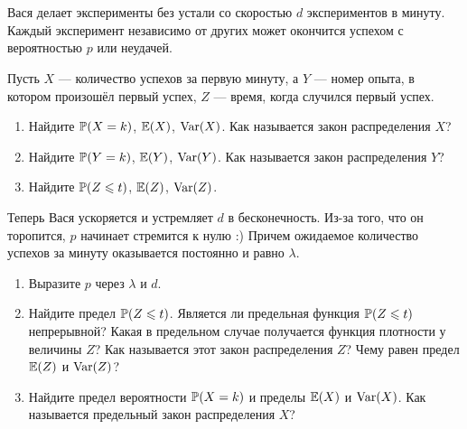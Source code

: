 \section{}

\begin{problem}
Вася делает эксперименты без устали со скоростью $d$ экспериментов в минуту. Каждый эксперимент независимо от других может окончится успехом с вероятностью $p$ или неудачей.

Пусть $X$ — количество успехов за первую минуту, а $Y$ — номер опыта, в котором произошёл первый успех, $Z$ — время, когда случился первый успех.
\begin{enumerate}
\item Найдите $\P(X = k)$, $\E(X)$, $\Var(X)$. Как называется закон распределения $X$?
\item Найдите $\P(Y = k)$, $\E(Y)$, $\Var(Y)$. Как называется закон распределения $Y$?
\item Найдите $\P(Z \leq t)$, $\E(Z)$, $\Var(Z)$.
\end{enumerate}

Теперь Вася ускоряется и устремляет $d$ в бесконечность. Из-за того, что он торопится, $p$ начинает стремится к нулю :) Причем ожидаемое количество успехов за минуту оказывается постоянно и равно $\lambda$.

\begin{enumerate}[resume]
\item Выразите $p$ через $\lambda$ и $d$.
\item Найдите предел $\P(Z \leq t)$. Является ли предельная функция $\P(Z \leq t)$ непрерывной? Какая в предельном случае получается функция плотности у величины $Z$? Как называется этот закон распределения $Z$? Чему равен предел $\E(Z)$ и $\Var(Z)$?
\item Найдите предел вероятности $\P(X = k)$ и пределы $\E(X)$ и $\Var(X)$. Как называется предельный закон распределения $X$?
\end{enumerate}
\begin{sol}
\end{sol}
\end{problem}

